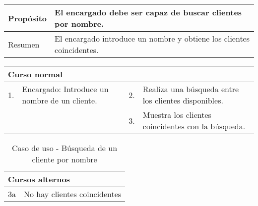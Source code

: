 \begin{table}[H]
	\centering
	\begin{tabular}{| m{} | m{} | m{} | m{} |}
		\hline
		Propósito & \multicolumn{3}{m{0.67\textwidth}|}{El encargado debe ser capaz de buscar clientes por nombre.}  \\ 
		\hline
		Resumen & \multicolumn{3}{m{0.67\textwidth}|}{El encargado introduce un nombre y obtiene los clientes coincidentes.} \\ 
		\hline
	\end{tabular}
\end{table}


\begin{table}[H]
	\centering
	\begin{tabular}{| m{} | m{} | m{} | m{} |}
		\hline
		\multicolumn{4}{|m{0.9\textwidth}|}{Curso normal}     \\ 
		\hline
		1. & Encargado: Introduce un nombre de un cliente. & 2. &  Realiza una búsqueda entre los clientes disponibles.  \\ 
		\hline
		&  & 3. &  Muestra los clientes coincidentes con la búsqueda.  \\ 
		\hline
	\end{tabular}
\end{table}

\begin{table}[H]
	\centering
	\begin{tabular}{| m{} | m{} | m{} | m{} |}
		\hline
		\multicolumn{4}{|m{0.9\textwidth}|}{Cursos alternos}     \\ 
		\hline
		3a & \multicolumn{3}{m{0.67\textwidth}|}{No hay clientes coincidentes} \\ 
		\hline
	\end{tabular}
	\caption{Caso de uso - Búsqueda de un cliente por nombre}
\end{table}

\newpage


